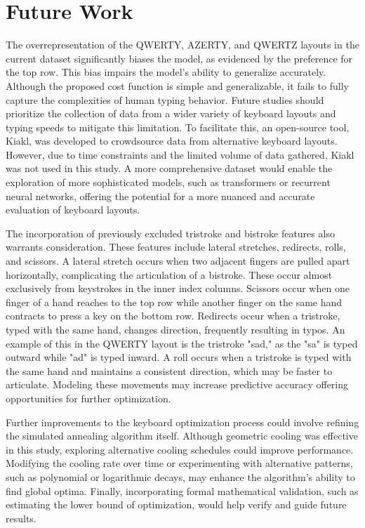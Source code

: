 \section{Future Work}
The overrepresentation of the QWERTY, AZERTY, and QWERTZ layouts in the current dataset significantly biases the model, as evidenced by the preference for the top row. This bias impairs the model's ability to generalize accurately. Although the proposed cost function is simple and generalizable, it fails to fully capture the complexities of human typing behavior. Future studies should prioritize the collection of data from a wider variety of keyboard layouts and typing speeds to mitigate this limitation. To facilitate this, an open-source tool, Kiakl, was developed to crowdsource data from alternative keyboard layouts. However, due to time constraints and the limited volume of data gathered, Kiakl was not used in this study. A more comprehensive dataset would enable the exploration of more sophisticated models, such as transformers or recurrent neural networks, offering the potential for a more nuanced and accurate evaluation of keyboard layouts.

The incorporation of previously excluded tristroke and bistroke features also warrants consideration. These features include lateral stretches, redirects, rolls, and scissors. A lateral stretch occurs when two adjacent fingers are pulled apart horizontally, complicating the articulation of a bistroke. These occur almost exclusively from keystrokes in the inner index columns. Scissors occur when one finger of a hand reaches to the top row while another finger on the same hand contracts to press a key on the bottom row. Redirects occur when a tristroke, typed with the same hand, changes direction, frequently resulting in typos. An example of this in the QWERTY layout is the tristroke "sad," as the "sa" is typed outward while "ad" is typed inward. A roll occurs when a tristroke is typed with the same hand and maintains a consistent direction, which may be faster to articulate. Modeling these movements may increase predictive accuracy offering opportunities for further optimization. 

Further improvements to the keyboard optimization process could involve refining the simulated annealing algorithm itself. Although geometric cooling was effective in this study, exploring alternative cooling schedules could improve performance. Modifying the cooling rate over time or experimenting with alternative patterns, such as polynomial or logarithmic decays, may enhance the algorithm's ability to find global optima. Finally, incorporating formal mathematical validation, such as estimating the lower bound of optimization, would help verify and guide future results.

